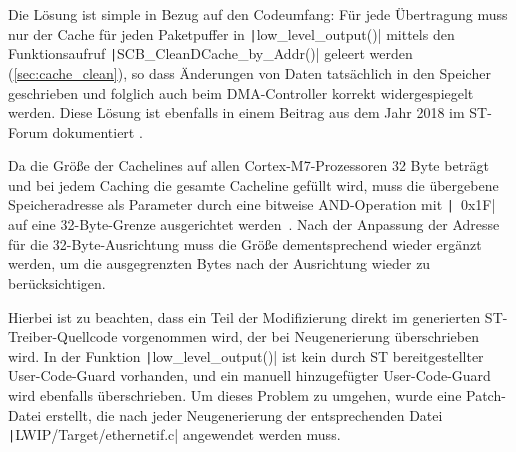 Die Lösung ist simple in Bezug auf den Codeumfang: Für jede Übertragung muss nur
der Cache für jeden Paketpuffer in \texttt|low_level_output()| mittels
den Funktionsaufruf \texttt|SCB_CleanDCache_by_Addr()| geleert werden
(\ref{sec:cache_clean}), so dass Änderungen von Daten tatsächlich in den
Speicher geschrieben und folglich auch beim DMA-Controller korrekt
widergespiegelt werden. Diese Lösung ist ebenfalls in einem Beitrag aus dem Jahr
2018 im ST-Forum dokumentiert \cite{ST_Forum_Post_2018}.

Da die Größe der Cachelines auf allen Cortex-M7-Prozessoren 32 Byte
beträgt~\cite[S. 4]{an4839} und bei jedem Caching die gesamte Cacheline gefüllt
wird, muss die übergebene Speicheradresse als Parameter durch eine bitweise
AND-Operation mit \texttt|~0x1F| auf eine 32-Byte-Grenze ausgerichtet
werden~\cite{CMSIS_Core_CacheFunctions}. Nach der Anpassung der Adresse für die
32-Byte-Ausrichtung muss die Größe dementsprechend wieder ergänzt werden, um die
ausgegrenzten Bytes nach der Ausrichtung wieder zu berücksichtigen.

Hierbei ist zu beachten, dass ein Teil der Modifizierung direkt im generierten
ST-Treiber-Quellcode vorgenommen wird, der bei Neugenerierung überschrieben
wird. In der Funktion \texttt|low_level_output()| ist kein durch ST
bereitgestellter User-Code-Guard vorhanden, und ein manuell hinzugefügter
User-Code-Guard wird ebenfalls überschrieben. Um dieses Problem zu umgehen,
wurde eine Patch-Datei erstellt, die nach jeder Neugenerierung der
entsprechenden Datei \texttt|LWIP/Target/ethernetif.c| angewendet
werden muss.
